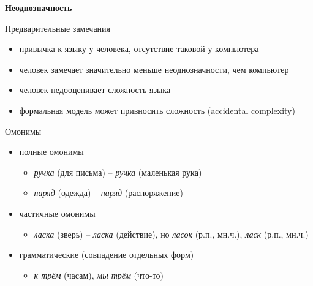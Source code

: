 \documentclass{beamer}
\begin{document}

\begin{frame}{}
\begin{center}
	\textbf{Неоднозначность}
\end{center}
\end{frame}

\begin{frame}{Предварительные замечания}
\begin{itemize}
	\item привычка к языку у человека, отсутствие таковой у компьютера
	\item человек замечает значительно меньше неоднозначности, чем компьютер 
	\item человек недооценивает сложность языка
	\item формальная модель может привносить сложность (accidental complexity)
\end{itemize}
\end{frame}

\begin{frame}{Омонимы}
\begin{itemize}
	\item полные омонимы
	    \begin{itemize}
	        \item \textit{ручка} (для письма) -- \textit{ручка} (маленькая рука)
	        \item \textit{наряд} (одежда) -- \textit{наряд} (распоряжение)
	    \end{itemize}
	\item частичные омонимы
	    \begin{itemize}
	        \item \textit{ласка} (зверь) -- \textit{ласка} (действие), но \textit{ласок} (р.п., мн.ч.), \textit{ласк} (р.п., мн.ч.)
	    \end{itemize}
	\item грамматические (совпадение отдельных форм)
	    \begin{itemize}
	        \item \textit{к трём} (часам), \textit{мы трём} (что-то)
	    \end{itemize}
\end{itemize}
\end{frame}
\end{document}
